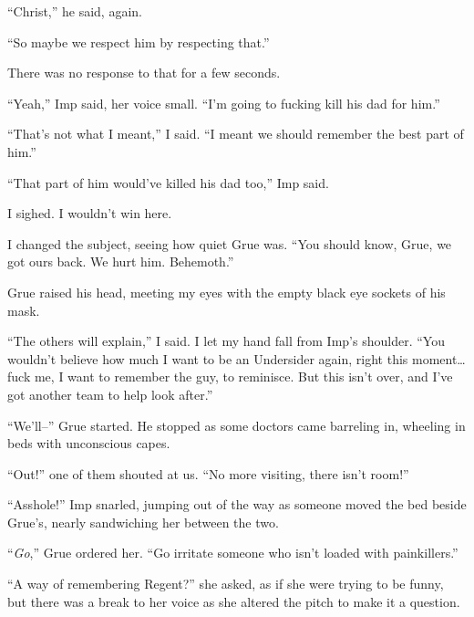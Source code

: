 ``Christ,'' he said, again.



``So maybe we respect him by respecting that.''



There was no response to that for a few seconds.



``Yeah,'' Imp said, her voice small.  ``I'm going to fucking kill his dad for him.''



``That's not what I meant,'' I said.  ``I meant we should remember the best part of him.''



``That part of him would've killed his dad too,'' Imp said.



I sighed.  I wouldn't win here.



I changed the subject, seeing how quiet Grue was.  ``You should know, Grue, we got ours back.  We hurt him.  Behemoth.''



Grue raised his head, meeting my eyes with the empty black eye sockets of his mask.



``The others will explain,'' I said.  I let my hand fall from Imp's shoulder.  ``You wouldn't believe how much I want to be an Undersider again, right this moment\ldots fuck me, I want to remember the guy, to reminisce.  But this isn't over, and I've got another team to help look after.''



``We'll--''  Grue started.  He stopped as some doctors came barreling in, wheeling in beds with unconscious capes.



``Out!'' one of them shouted at us.  ``No more visiting, there isn't room!''



``Asshole!'' Imp snarled, jumping out of the way as someone moved the bed beside Grue's, nearly sandwiching her between the two.



``\emph{Go},'' Grue ordered her.  ``Go irritate someone who isn't loaded with painkillers.''



``A way of remembering Regent?'' she asked, as if she were trying to be funny, but there was a break to her voice as she altered the pitch to make it a question.




